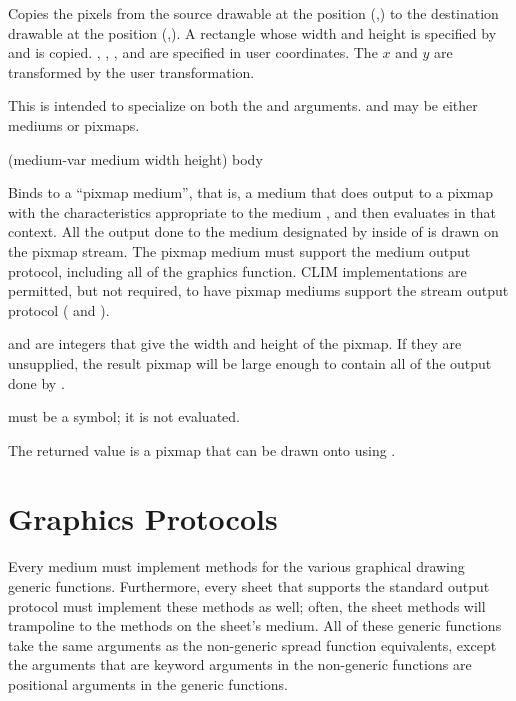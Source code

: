 Copies the pixels from the source drawable  at the position
(,) to the destination drawable  at the
position (,).  A rectangle whose width and height is
specified by  and  is copied.  ,
, , and  are specified in user coordinates.
The $x$ and $y$ are transformed by the user transformation.

This is intended to specialize on both the  and
 arguments.   and  may be
either mediums or pixmaps.


 {(medium-var medium \key width height) \body body}

Binds  to a ``pixmap medium'', that is, a medium that does
output to a pixmap with the characteristics appropriate to the medium
, and then evaluates  in that context.  All the output done
to the medium designated by  inside of  is drawn on
the pixmap stream.  The pixmap medium must support the medium output protocol,
including all of the graphics function.  CLIM implementations are permitted, but
not required, to have pixmap mediums support the stream output protocol
( and ).

 and  are integers that give the width and height of the
pixmap.  If they are unsupplied, the result pixmap will be large enough to
contain all of the output done by .

 must be a symbol; it is not evaluated.

The returned value is a pixmap that can be drawn onto  using
.


\section {Graphics Protocols\label{graphics-protocols}}

Every medium must implement methods for the various graphical drawing generic
functions.  Furthermore, every sheet that supports the standard output protocol
must implement these methods as well; often, the sheet methods will trampoline
to the methods on the sheet's medium.  All of these generic functions take the
same arguments as the non-generic spread function equivalents, except the
arguments that are keyword arguments in the non-generic functions are positional
arguments in the generic functions.

